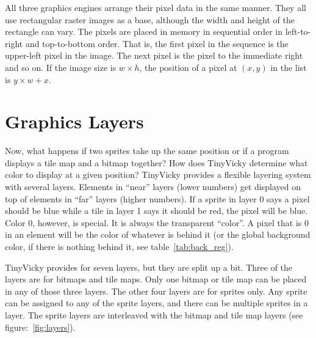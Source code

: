 All three graphics engines arrange their pixel data in the same manner. They all use rectangular raster images as a base, although the width and height of the rectangle can vary. The pixels are placed in memory in sequential order in left-to-right and top-to-bottom order. That is, the first pixel in the sequence is the upper-left pixel in the image. The next pixel is the pixel to the immediate right and so on. If the image size is $w \times h$, the position of a pixel at $(x, y)$ in the list is $y \times w + x$.

\section*{Graphics Layers}

Now, what happens if two sprites take up the same position or if a program displays a tile map and a bitmap together? How does TinyVicky determine what color to display at a given position? TinyVicky provides a flexible layering system with several layers. Elements in ``near'' layers (lower numbers) get displayed on top of elements in ``far'' layers (higher numbers). If a sprite in layer 0 says a pixel should be blue while a tile in layer 1 says it should be red, the pixel will be blue. Color 0, however, is special. It is always the transparent ``color''. A pixel that is 0 in an element will be the color of whatever is behind it (or the global background color, if there is nothing behind it, see table~\ref{tab:back_reg}).

TinyVicky provides for seven layers, but they are split up a bit. Three of the layers are for bitmaps and tile maps. Only one bitmap or tile map can be placed in any of those three layers. The other four layers are for sprites only. Any sprite can be assigned to any of the sprite layers, and there can be multiple sprites in a layer. The sprite layers are interleaved with the bitmap and tile map layers (see figure:~\ref{fig:layers}).

